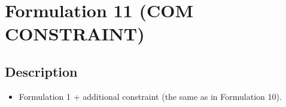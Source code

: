 \section{Formulation 11 (COM CONSTRAINT)}\label{sec.form08}


\subsection{Description}
\begin{itemize}
    \item Formulation 1 + additional constraint (the same as in Formulation 10).
\end{itemize}


